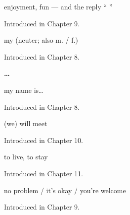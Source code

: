 \noindent\begin{minipage}[t]{\linewidth}
\raggedright
\textbf{}\par
\small enjoyment, fun — and the reply \textquotedblleft{}  \textquotedblright{}\par
\footnotesize Introduced in Chapter 9.
\end{minipage}\par\medskip

\noindent\begin{minipage}[t]{\linewidth}
\raggedright
\textbf{}\par
\small my (neuter; also  m. /  f.)\par
\footnotesize Introduced in Chapter 8.
\end{minipage}\par\medskip

\noindent\begin{minipage}[t]{\linewidth}
\raggedright
\textbf{  … }\par
\small my name is…\par
\footnotesize Introduced in Chapter 8.
\end{minipage}\par\medskip

\noindent\begin{minipage}[t]{\linewidth}
\raggedright
\textbf{}\par
\small (we) will meet\par
\footnotesize Introduced in Chapter 10.
\end{minipage}\par\medskip

\noindent\begin{minipage}[t]{\linewidth}
\raggedright
\textbf{}\par
\small to live, to stay\par
\footnotesize Introduced in Chapter 11.
\end{minipage}\par\medskip

\noindent\begin{minipage}[t]{\linewidth}
\raggedright
\textbf{ }\par
\small no problem / it's okay / you're welcome\par
\footnotesize Introduced in Chapter 9.
\end{minipage}\par\medskip

